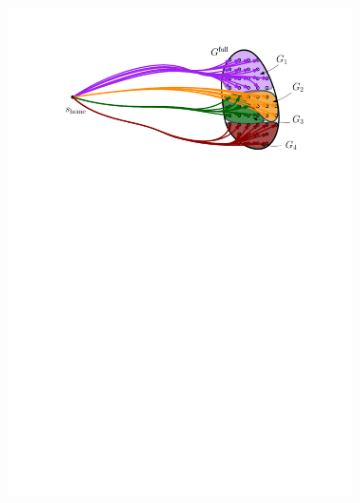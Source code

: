 \documentclass[conference]{IEEEtran}
\begin{document}

\begin{figure}[t]
    \centering
    \begin{subfigure}{.225\textwidth}
        \includegraphics[width=\textwidth]{naive1}
        \caption{}
        \label{fig:naive1}
    \end{subfigure}
    \hfill
    \begin{subfigure}{0.225\textwidth}

\end{subfigure}
\end{figure}
\end{document}
